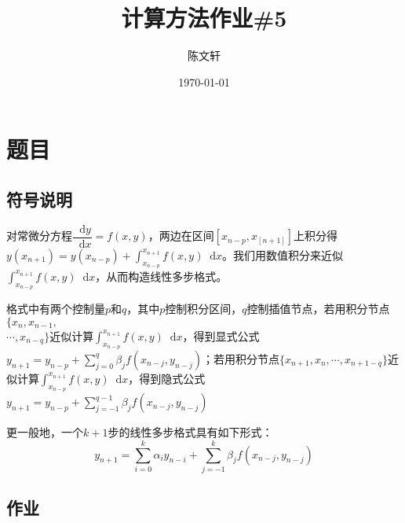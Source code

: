 \documentclass[cn,hazy,green,11pt,normal]{elegantnote}
\title{计算方法作业\#5}
\author{陈文轩}
\institute{KFRC}
\date{\today}
\newcommand*{\diff}{\mathop{}\!\mathrm{d}}
\begin{document}
\maketitle


\section{题目}

    \subsection{符号说明}

        对常微分方程$\dfrac{\diff y}{\diff x}=f(x,y)$，两边在区间$[x_{n-p},x_[n+1]]$上积分得$y(x_{n+1})=y(x_{n-p})+\int_{x_{n-p}}^{x_{n+1}}f(x,y)\diff x$。我们用数值积分来近似$\int_{x_{n-p}}^{x_{n+1}}f(x,y)\diff x$，从而构造线性多步格式。

        格式中有两个控制量$p$和$q$，其中$p$控制积分区间，$q$控制插值节点，若用积分节点$\{x_n,x_{n-1},$\\$\cdots,x_{n-q}\}$近似计算$\int_ {x_{n-p}}^{x_{n+1}}f(x,y)\diff x$，得到显式公式$y_{n+1}=y_{n-p}+\sum_{j=0}^q \beta_j f(x_{n-j},y_{n-j})$；若用积分节点$\{x_{n+1},x_n,\cdots,x_{n+1-q}\}$近似计算$\int_{x_{n-p}}^{x_{n+1}}f(x,y)\diff x$，得到隐式公式 $y_{n+1}=y_{n-p}+\sum_{j=-1}^{q-1} \beta_j f(x_{n-j},y_{n-j})$

        更一般地，一个$k+1$步的线性多步格式具有如下形式：
        \[y_{n+1}=\sum_{i=0}^k \alpha_i y_{n-i}+\sum_{j=-1}^k \beta_j f(x_{n-j},y_{n-j})\]

    \subsection{作业}
\end{document}
